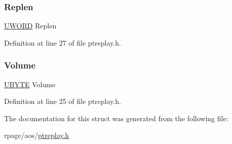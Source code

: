 \mbox{\label{struct_p_t_sample_a394fbd880f8bd006214517333330cd48}} 
\subsubsection{\texorpdfstring{Replen}{Replen}}
{\footnotesize\ttfamily \mbox{\hyperlink{utils_8h_aefbb6ca39ebcf009709e607d159766d5}{U\+W\+O\+RD}} Replen}



Definition at line 27 of file ptreplay.\+h.

\mbox{\label{struct_p_t_sample_adc4b7a0c5b86145401ff9bf56d52bf7a}} 
\subsubsection{\texorpdfstring{Volume}{Volume}}
{\footnotesize\ttfamily \mbox{\hyperlink{utils_8h_a122c4acf389c050379f00341fdcd5812}{U\+B\+Y\+TE}} Volume}



Definition at line 25 of file ptreplay.\+h.



The documentation for this struct was generated from the following file\+:\begin{DoxyCompactItemize}
\item 
rpage/aos/\mbox{\hyperlink{ptreplay_8h}{ptreplay.\+h}}\end{DoxyCompactItemize}
